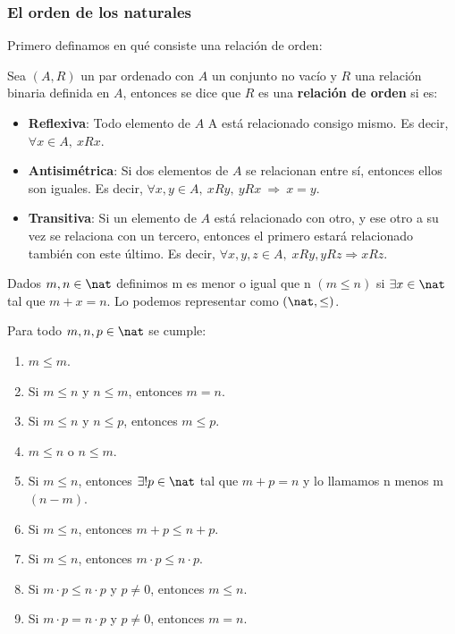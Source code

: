 \subsubsection{El orden de los naturales}
Primero definamos en qué consiste una relación de orden:
\begin{ndef}
    Sea $(A,R)$ un par ordenado con $A$ un conjunto no vacío y $R$ una relación binaria definida en $A$, entonces se dice que $R$ es una \textbf{relación de orden} si es:
    \begin{itemize}
        \item \textbf{Reflexiva}: Todo elemento de $A$ A está relacionado consigo mismo. Es decir, $\forall x\in A,\ xRx$.
        \item \textbf{Antisimétrica}: Si dos elementos de $A$ se relacionan entre sí, entonces ellos son iguales. Es decir, $\forall x,y\in A,\ xRy,\ yRx \ \Rightarrow \ x=y$.
        \item \textbf{Transitiva}: Si un elemento de $A$ está relacionado con otro, y ese otro a su vez se relaciona con un tercero, entonces el primero estará relacionado también con este último. Es decir, $\forall x,y,z\in A,\;xRy,yRz\Rightarrow xRz$.
    \end{itemize}
\end{ndef}
\begin{ndef}[Orden]
    Dados $m,n \in \nat$ definimos m es menor o igual que n $(m \leq n)$ si $\exists x \in \nat$ tal que $m + x = n$. Lo podemos representar como $(\nat,\leq)$.
\end{ndef}

\begin{properties}
    Para todo $m,n,p \in \nat$ se cumple:
    \begin{enumerate}
        \item $m \leq m$.
        \item Si $m \leq n$ y $n \leq m$, entonces $m = n$.
        \item Si $m \leq n$ y $n \leq p$, entonces $m \leq p$.
        \item $m \leq n$ o $n \leq m$.
        \item Si $m \leq n$, entonces $\exists! p \in \nat$ tal que $m + p = n$ y lo llamamos n menos m $(n - m)$.
        \item Si $m \leq n$, entonces $m + p \leq n + p$.
        \item Si $m \leq n$, entonces $m \cdot p \leq n \cdot p$.
        \item Si $m \cdot p \leq n \cdot p$ y $p \neq 0$, entonces $m \leq n$.
        \item Si $m \cdot p = n \cdot p$ y $p \neq 0$, entonces $m = n$.
    \end{enumerate}
\end{properties}

